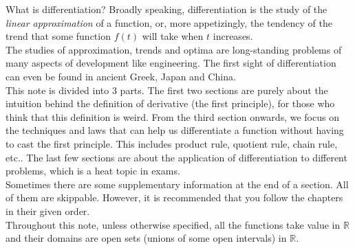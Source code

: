 What is differentiation?
Broadly speaking, differentiation is the study of the \textit{linear approximation} of a function, or, more appetizingly, the tendency of the trend that some function $f(t)$ will take when $t$ increases.\\
The studies of approximation, trends and optima are long-standing problems of many aspects of development like engineering.
The first sight of differentiation can even be found in ancient Greek, Japan and China.\\
This note is divided into 3 parts.
The first two sections are purely about the intuition behind the definition of derivative (the first principle), for those who think that this definition is weird.
From the third section onwards, we focus on the techniques and laws that can help us differentiate a function without having to cast the first principle.
This includes product rule, quotient rule, chain rule, etc..
The last few sections are about the application of differentiation to different problems, which is a heat topic in exams.\\
Sometimes there are some supplementary information at the end of a section.
All of them are skippable.
However, it is recommended that you follow the chapters in their given order.\\
Throughout this note, unless otherwise specified, all the functions take value in $\mathbb R$ and their domains are open sets (unions of some open intervals) in $\mathbb R$.
